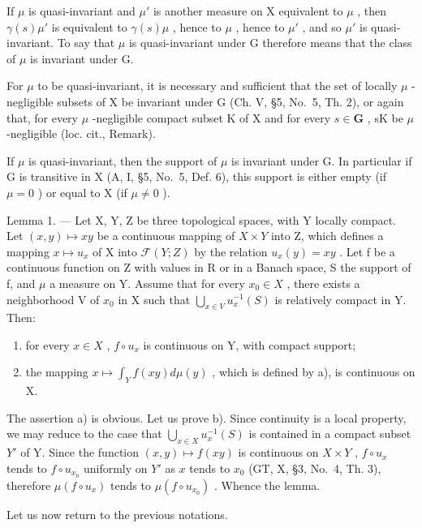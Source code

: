 If \(\mu\) is quasi-invariant and \(\mu'\) is another measure on X equivalent to \(\mu\) , then \(\gamma(s)\mu'\) is equivalent to \(\gamma(s)\mu\) , hence to \(\mu\) , hence to \(\mu'\) , and so \(\mu'\) is quasi-invariant. To say that \(\mu\) is quasi-invariant under G therefore means that the class of \(\mu\) is invariant under G.

For \(\mu\) to be quasi-invariant, it is necessary and sufficient that the set of locally \(\mu\) -negligible subsets of X be invariant under G (Ch. V, §5, No.~5, Th. 2), or again that, for every \(\mu\) -negligible compact subset K of X and for every \(s \in \mathbf{G}\) , sK be \(\mu\) -negligible (loc. cit., Remark).

If \(\mu\) is quasi-invariant, then the support of \(\mu\) is invariant under G. In particular if G is transitive in X (A, I, §5, No.~5, Def. 6), this support is either empty (if \(\mu = 0\) ) or equal to X (if \(\mu \neq 0\) ).

Lemma 1. --- Let X, Y, Z be three topological spaces, with Y locally compact. Let \((x,y)\mapsto xy\) be a continuous mapping of \(X\times Y\) into Z, which defines a mapping \(x\mapsto u_{x}\) of X into \(\mathcal{F}(Y;Z)\) by the relation \(u_{x}(y)=xy\) . Let f be a continuous function on Z with values in R or in a Banach space, S the support of f, and \(\mu\) a measure on Y. Assume that for every \(x_{0}\in X\) , there exists a neighborhood V of \(x_{0}\) in X such that \(\bigcup_{x\in V}u_{x}^{-1}(S)\) is relatively compact in Y. Then:

\begin{enumerate}
\def\labelenumi{\alph{enumi})}
\tightlist
\item
  for every \(x \in X\) , \(f \circ u_{x}\) is continuous on Y, with compact support;
\item
  the mapping \(x \mapsto \int_{Y} f(xy) d\mu(y)\) , which is defined by a), is continuous on X.
\end{enumerate}

The assertion a) is obvious. Let us prove b). Since continuity is a local property, we may reduce to the case that \(\bigcup_{x\in X}u_x^{-1}(S)\) is contained in a compact subset \(Y'\) of Y. Since the function \((x,y)\mapsto f(xy)\) is continuous on \(X\times Y\) , \(f\circ u_x\) tends to \(f\circ u_{x_0}\) uniformly on \(Y'\) as \(x\) tends to \(x_0\) (GT, X, §3, No.~4, Th. 3), therefore \(\mu(f \circ u_x)\) tends to \(\mu(f \circ u_{x_0})\) . Whence the lemma.

Let us now return to the previous notations.


